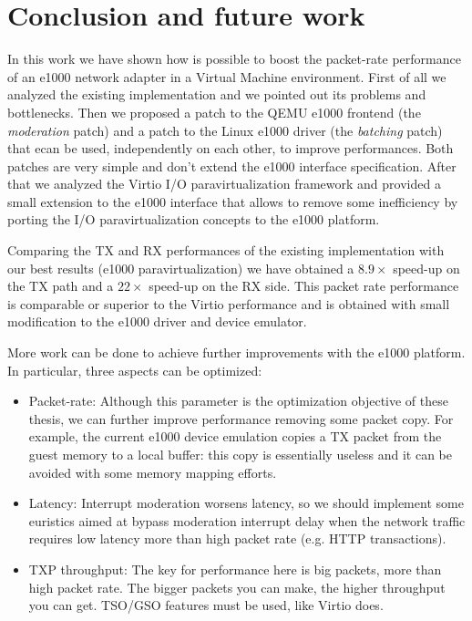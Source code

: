 \chapter*{Conclusion and future work}
In this work we have shown how is possible to boost the packet-rate performance of an e1000 network adapter in a Virtual
Machine environment.
First of all we analyzed the existing implementation and we pointed out its problems and bottlenecks.
Then we proposed a patch to the QEMU e1000 frontend (the \emph{moderation} patch) and a patch to the Linux e1000 driver (the \emph{batching}
patch) that ecan be used, independently on each other, to improve performances. Both patches are very simple and don't extend the e1000
interface specification.
After that we analyzed the Virtio I/O paravirtualization framework and provided a small extension to the e1000 interface that allows to remove
some inefficiency by porting the I/O paravirtualization concepts to the e1000 platform.

\vspace{0.5cm}

Comparing the TX and RX performances of the existing implementation with our best results (e1000 paravirtualization) we have obtained
a $8.9 \times$ speed-up on the TX path and a $22 \times$ speed-up on the RX side.
This packet rate performance is comparable or superior to the Virtio performance and is obtained with small modification to the e1000
driver and device emulator.

\vspace{0.5cm}

More work can be done to achieve further improvements with the e1000 platform. In particular, three aspects can be optimized:
\begin{itemize}
  \item Packet-rate: Although this parameter is the optimization objective of these thesis, we can further improve performance removing
	some packet copy. For example, the current e1000 device emulation copies a TX packet from the guest memory to a local buffer: this
	copy is essentially useless and it can be avoided with some memory mapping efforts.
	
  \item Latency: Interrupt moderation worsens latency, so we should implement some euristics aimed at bypass moderation interrupt delay
	when the network traffic requires low latency more than high packet rate (e.g. HTTP transactions).
	
  \item TXP throughput: The key for performance here is big packets, more than high packet rate. The bigger packets you can make, the
	higher throughput you can get. TSO/GSO features must be used, like Virtio does.
\end{itemize}
